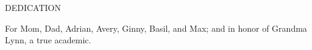 \begin{center}
DEDICATION

\hspace{15cm}

For Mom, Dad, Adrian, Avery, Ginny, Basil, and Max;
and in honor of Grandma Lynn, a true academic. 

\end{center}
